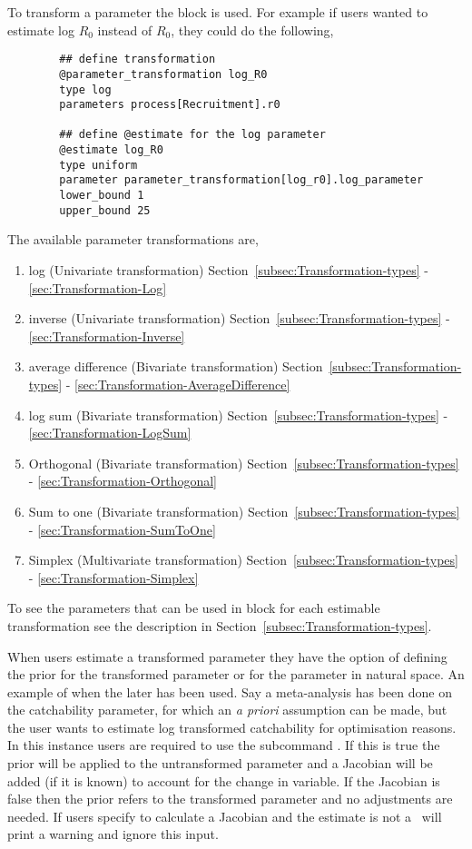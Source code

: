 To transform a parameter the  block is used. For example if users wanted to estimate log \(R_0\) instead of \(R_0\), they could do the following,
{\small{\begin{verbatim}
		## define transformation
		@parameter_transformation log_R0
		type log
		parameters process[Recruitment].r0

		## define @estimate for the log parameter
		@estimate log_R0
		type uniform
		parameter parameter_transformation[log_r0].log_parameter
		lower_bound 1
		upper_bound 25
\end{verbatim}}}
%
The available parameter transformations are,
\begin{enumerate}
	\item log (Univariate transformation) Section~\ref{subsec:Transformation-types} - \ref{sec:Transformation-Log}
	\item inverse (Univariate transformation) Section~\ref{subsec:Transformation-types} - \ref{sec:Transformation-Inverse}
	\item average difference (Bivariate transformation) Section~\ref{subsec:Transformation-types} - \ref{sec:Transformation-AverageDifference}
	\item log sum (Bivariate transformation) Section~\ref{subsec:Transformation-types} - \ref{sec:Transformation-LogSum}	
	\item Orthogonal (Bivariate transformation) Section~\ref{subsec:Transformation-types} - \ref{sec:Transformation-Orthogonal}
	\item Sum to one (Bivariate transformation) Section~\ref{subsec:Transformation-types} - \ref{sec:Transformation-SumToOne}
	\item Simplex (Multivariate transformation) Section~\ref{subsec:Transformation-types} - \ref{sec:Transformation-Simplex}	
\end{enumerate}

To see the parameters that can be used in  block for each estimable transformation see the  description in Section~\ref{subsec:Transformation-types}.

When users estimate a transformed parameter they have the option of defining the prior for the transformed parameter or for the parameter in natural space. An example of when the later has been used. Say a meta-analysis has been done on the catchability parameter, for which an \textit{a priori} assumption can be made, but the user wants to estimate log transformed catchability for optimisation reasons. In this instance users are required to use the subcommand . If this is true the prior will be applied to the untransformed parameter and a Jacobian will be added (if it is known) to account for the change in variable. If the Jacobian is false then the prior refers to the transformed parameter and no adjustments are needed. If users specify to calculate a Jacobian and the estimate is not a  \CNAME\ will print a warning and ignore this input.

